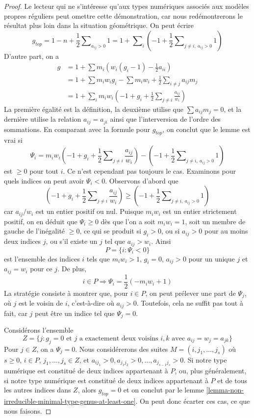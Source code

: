 \begin{proof}
Le lecteur qui ne s'intéresse qu'aux types numériques
associés aux modèles propres réguliers peut omettre cette démonstration, car nous
redémontrerons le résultat plus loin dans la situation géométrique.
On peut écrire
$$
g_{top} = 1 - n + \frac{1}{2}\sum\nolimits_{a_{ij} > 0} 1 =
1 + \sum\nolimits_i (-1 +
\frac{1}{2}\sum\nolimits_{j \not = i,\ a_{ij} > 0} 1) 
$$
D'autre part, on a
\begin{align*}
g & =
1 + \sum m_i(w_i(g_i - 1) - \frac{1}{2} a_{ii}) \\
& =
1 + \sum m_iw_ig_i - \sum m_iw_i +
\frac{1}{2} \sum\nolimits_{i \not = j} a_{ij}m_j \\
& =
1 + \sum\nolimits_i
m_iw_i(-1 + g_i + \frac{1}{2} \sum\nolimits_{j \not = i} \frac{a_{ij}}{w_i})
\end{align*}
La première égalité est la définition, la deuxième utilise que
$\sum a_{ij}m_j = 0$, et la dernière utilise
la relation $a_{ij} = a_{ji}$ ainsi que l'interversion de l'ordre
des sommations. En comparant avec la formule pour $g_{top}$, on conclut
que le lemme est vrai si
$$
\Psi_i =
m_iw_i(-1 + g_i + \frac{1}{2} \sum\nolimits_{j \not = i} \frac{a_{ij}}{w_i})
- (-1 + \frac{1}{2}\sum\nolimits_{j \not = i,\ a_{ij} > 0} 1)
$$
est $\geq 0$ pour tout $i$. Ce n'est cependant pas toujours le cas.
Examinons pour quels indices on peut avoir $\Psi_i < 0$.
Observons d'abord que
$$
(-1 + g_i + \frac{1}{2}\sum\nolimits_{j \not = i} \frac{a_{ij}}{w_i}) \geq
(-1 + \frac{1}{2}\sum\nolimits_{j \not = i,\ a_{ij} > 0} 1)
$$
car $a_{ij}/w_i$ est un entier positif ou nul. Puisque $m_iw_i$ est
un entier strictement positif, on en déduit que $\Psi_i \geq 0$ dès que
l'on a soit $m_iw_i = 1$, soit un membre de gauche de l'inégalité $\geq 0$,
ce qui se produit si $g_i > 0$, ou si $a_{ij} > 0$ pour au moins deux indices $j$, ou
s'il existe un $j$ tel que $a_{ij} > w_i$. Ainsi
$$
P = \{i : \Psi_i < 0\}
$$
est l'ensemble des indices $i$ tels que $m_iw_i > 1$, $g_i = 0$,
$a_{ij} > 0$ pour un unique $j$ et $a_{ij} = w_i$ pour ce $j$.
De plus,
$$
i \in P \Rightarrow \Psi_i = \frac{1}{2}(-m_iw_i + 1)
$$
La stratégie consiste à montrer que, pour $i \in P$, on peut prélever une part
de $\Psi_j$, où $j$ est le voisin de $i$, c'est-à-dire où $a_{ij} > 0$.
Toutefois, cela ne suffit pas tout à fait, car $j$ peut être un indice tel que $\Psi_j = 0$.

\medskip\noindent
Considérons l'ensemble
$$
Z = \{j : g_j = 0\text{ et }
j\text{ a exactement deux voisins }i, k\text{ avec }
a_{ij} = w_j = a_{jk}\}
$$
Pour $j \in Z$, on a $\Psi_j = 0$. Nous considérerons des suites
$M = (i, j_1, \ldots, j_s)$ où $s \geq 0$,
$i \in P$, $j_1, \ldots, j_s \in Z$, et
$a_{ij_1} > 0, a_{j_1j_2} > 0, \ldots, a_{j_{s - 1}j_s} > 0$.
Si notre type numérique est constitué de deux indices appartenant à $P$,
ou, plus généralement, si notre type numérique est constitué de
deux indices appartenant à $P$ et de tous les autres indices dans $Z$, alors
$g_{top} = 0$ et on conclut par le
lemme \ref{lemma-non-irreducible-minimal-type-genus-at-least-one}.
On peut donc écarter ces cas, ce que nous faisons.


\end{proof}
